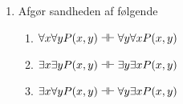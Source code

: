 \begin{opg}
\begin{enumerate}
\begin{solution}
\begin{proofbox}
			\[
				\lbl{forall_is_false}
				\: \neg \forall x \, \neg \phi \= \text{antagelse (for $\imp$i)} \\
				\lbl{pbc_box}
				\[
					\lbl{is_false}
					\: \neg \exists x \, \phi \= \text{antagelse (for PBC)} \\
					\lbl{forall_box}
					\[
						x_0 \: \= \text{lad $x_0$ være givet (for $\forall x$ i)} \\
						\lbl{neg_box}
						\[
							\lbl{phi_true}
							\: \phi[x_0/x] \= \text{antagelse (for $\neg$i)} \\
							\lbl{is_true}
							\: \exists x \, \phi \= \exists x\text{ i } \ref{phi_true} \\
							\label{_pr_exc1_neg_box2a_end}
							\: \bot \= \neg\text{e } \ref{is_true},\ref{is_false}
						\]
						\label{_pr_exc1_forall_box2a_end}
						\: \neg \phi[x_0/x] \=  \ref{neg_box}-\ref{_pr_exc1_neg_box2a_end}
					\]
					\: \forall x \, \neg \phi \= \forall x  \ref{forall_box}-\ref{_pr_exc1_forall_box2a_end} \\
					\label{_pr_exc1_pbc_box2a_end}
					\: \bot \=  \ref{forall_is_true},\ref{forall_is_false}
				\]
				\label{_pr_exc1_imp_box2a_end}
				\: \exists x \, \phi \=  \ref{pbc_box}-\ref{_pr_exc1_pbc_box2a_end}
			\]
			\: \neg \forall x \, \neg \phi \imp \exists x \, \phi \=  \ref{imp_box2}-\ref{_pr_exc1_imp_box2a_end} \\
			\: \exists x \, \phi \bimp \neg \forall x \, \neg \phi \=  \ref{imp1},\ref{imp2}
		\end{proofbox}
	\end{solution}
	\item{Afgør sandheden af følgende}
	\begin{enumerate}
		\item $\forall x \forall y P(x,y) \dashv\vdash \forall y \forall x P(x,y)$
		\item $\exists x \exists y P(x,y) \dashv\vdash \exists y \exists x P(x,y)$
		\item $\exists x \forall y P(x,y) \dashv\vdash \forall y \exists x P(x,y)$
	\end{enumerate}
\end{enumerate}
\end{opg}

\ifdefined\startOpgaverPraedikatlogik\fi

